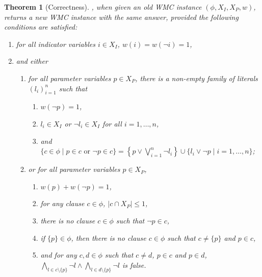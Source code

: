 \documentclass{article}
\newtheorem{theorem}{Theorem}
\theoremstyle{definition}
\theoremstyle{remark}
\begin{document}
\begin{theorem}[Correctness]
  , when given an old WMC instance $(\phi, X_I, X_P,
  w)$, returns a new WMC instance with the same answer, provided the following
  conditions are satisfied:
  \begin{enumerate}
  \item for all indicator variables $i \in X_I$, $w(i) = w(\neg i) = 1$,
  \item and either
    \begin{enumerate}
    \item for all parameter variables $p \in X_P$, there is a non-empty family
      of literals $(l_i)_{i=1}^n$ such that \label{condition:d02}
      \begin{enumerate}
      \item $w(\neg p) = 1$,
      \item $l_i \in X_I$ or $\neg l_i \in X_I$ for all $i = 1, \dots, n$,
        \label{condition:equivalence1}
      \item and $\{ c \in \phi \mid p \in c \text{ or } \neg p \in c \} =
        \left\{p \lor \bigvee_{i=1}^n \neg l_i \right\} \cup \{ l_i \lor \neg p
        \mid i = 1, \dots, n \}$; \label{condition:equivalence2}
      \end{enumerate}
    \item or for all parameter variables $p \in X_P$, \label{condition:bklm16}
      \begin{enumerate}
      \item $w(p) + w(\neg p) = 1$,
      \item for any clause $c \in \phi$, $|c \cap X_P| \le 1$,
      \item there is no clause $c \in \phi$ such that $\neg p \in c$,
      \item if $\{ p \} \in \phi$, then there is no clause $c \in \phi$ such
        that $c \ne \{ p \}$ and $p \in c$, \label{cond:just_parameter}
      \item and for any $c, d \in \phi$ such that $c \ne d$, $p \in c$ and $p
        \in d$, $\bigwedge_{l \in c \setminus \{ p \}} \neg l \land \bigwedge_{l
          \in d \setminus \{ p \}} \neg l$ is false. \label{cond:disjoint}
      \end{enumerate}
    \end{enumerate}
  \end{enumerate}
\end{theorem} %
\end{document}
